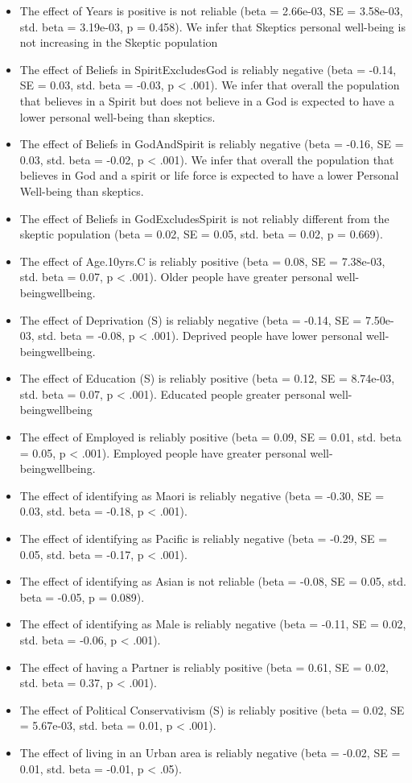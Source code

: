 \documentclass[
  english,
  man]{apa6}
\providecommand{\tightlist}{%
  \setlength{\itemsep}{0pt}\setlength{\parskip}{0pt}}
\begin{document}
\begin{itemize}
\tightlist
\item
  The effect of Years is positive is not reliable (beta = 2.66e-03, SE = 3.58e-03, std. beta = 3.19e-03, p = 0.458). We infer that Skeptics personal well-being is not increasing in the Skeptic population
\item
  The effect of Beliefs in SpiritExcludesGod is reliably negative (beta = -0.14, SE = 0.03, std. beta = -0.03, p \textless{} .001). We infer that overall the population that believes in a Spirit but does not believe in a God is expected to have a lower personal well-being than skeptics.
\item
  The effect of Beliefs in GodAndSpirit is reliably negative (beta = -0.16, SE = 0.03, std. beta = -0.02, p \textless{} .001). We infer that overall the population that believes in God and a spirit or life force is expected to have a lower Personal Well-being than skeptics.
\item
  The effect of Beliefs in GodExcludesSpirit is not reliably different from the skeptic population (beta = 0.02, SE = 0.05, std. beta = 0.02, p = 0.669).
\item
  The effect of Age.10yrs.C is reliably positive (beta = 0.08, SE = 7.38e-03, std. beta = 0.07, p \textless{} .001). Older people have greater personal well-beingwellbeing.
\item
  The effect of Deprivation (S) is reliably negative (beta = -0.14, SE = 7.50e-03, std. beta = -0.08, p \textless{} .001). Deprived people have lower personal well-beingwellbeing.
\item
  The effect of Education (S) is reliably positive (beta = 0.12, SE = 8.74e-03, std. beta = 0.07, p \textless{} .001). Educated people greater personal well-beingwellbeing
\item
  The effect of Employed is reliably positive (beta = 0.09, SE = 0.01, std. beta = 0.05, p \textless{} .001). Employed people have greater personal well-beingwellbeing.
\item
  The effect of identifying as Maori is reliably negative (beta = -0.30, SE = 0.03, std. beta = -0.18, p \textless{} .001).
\item
  The effect of identifying as Pacific is reliably negative (beta = -0.29, SE = 0.05, std. beta = -0.17, p \textless{} .001).
\item
  The effect of identifying as Asian is not reliable (beta = -0.08, SE = 0.05, std. beta = -0.05, p = 0.089).
\item
  The effect of identifying as Male is reliably negative (beta = -0.11, SE = 0.02, std. beta = -0.06, p \textless{} .001).
\item
  The effect of having a Partner is reliably positive (beta = 0.61, SE = 0.02, std. beta = 0.37, p \textless{} .001).
\item
  The effect of Political Conservativism (S) is reliably positive (beta = 0.02, SE = 5.67e-03, std. beta = 0.01, p \textless{} .001).
\item
  The effect of living in an Urban area is reliably negative (beta = -0.02, SE = 0.01, std. beta = -0.01, p \textless{} .05).
\end{itemize}
\end{document}
